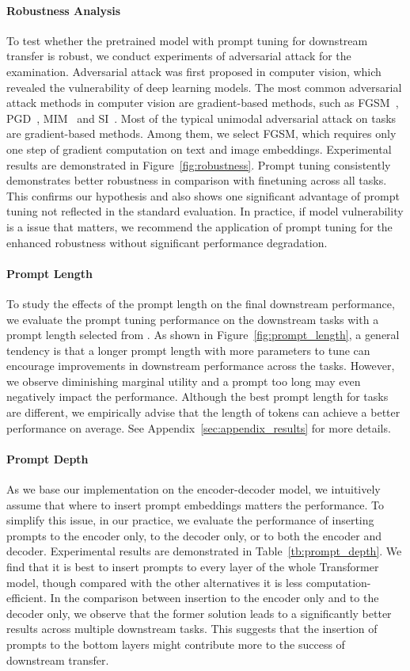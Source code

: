 \documentclass[11pt]{article}
\begin{document}
\paragraph{Robustness Analysis}
To test whether the pretrained model with prompt tuning for downstream transfer is robust, we conduct experiments of adversarial attack for the examination. 
Adversarial attack was first proposed in computer vision, which revealed the vulnerability of deep learning models. The most common adversarial attack methods in computer vision are gradient-based methods, such as FGSM~\citep{fgsm}, PGD~\citep{pgd}, MIM~\citep{mim} and SI~\citep{si}. 
Most of the typical unimodal adversarial attack on tasks are gradient-based methods. 
Among them, we select FGSM, which requires only one step of gradient computation on text and image embeddings. 
Experimental results are demonstrated in Figure~\ref{fig:robustness}. 
Prompt tuning consistently demonstrates better robustness in comparison with finetuning across all tasks. 
This confirms our hypothesis and also shows one significant advantage of prompt tuning not reflected in the standard evaluation. 
In practice, if model vulnerability is a issue that matters, we recommend the application of prompt tuning for the enhanced robustness without significant performance degradation. 

\paragraph{Prompt Length}
To study the effects of the prompt length on the final downstream performance, we evaluate the prompt tuning performance on the downstream tasks with a prompt length selected from . 
As shown in Figure~\ref{fig:prompt_length}, a general tendency is that a longer prompt length with more parameters to tune can encourage improvements in downstream performance across the tasks. 
However, we observe diminishing marginal utility and a prompt too long may even negatively impact the performance. 
Although the best prompt length for tasks are different, we empirically advise that the length of  tokens can achieve a better performance on average. See Appendix~\ref{sec:appendix_results} for more details. 

\paragraph{Prompt Depth}
As we base our implementation on the encoder-decoder model, we intuitively assume that where to insert prompt embeddings matters the performance. 
To simplify this issue, in our practice, we evaluate the performance of inserting prompts to the encoder only, to the decoder only, or to both the encoder and decoder. 
Experimental results are demonstrated in Table~\ref{tb:prompt_depth}. 
We find that it is best to insert prompts to every layer of the whole Transformer model, though compared with the other alternatives it is less computation-efficient. 
In the comparison between insertion to the encoder only and to the decoder only, we observe that the former solution leads to a significantly better results across multiple downstream tasks. 
This suggests that the insertion of prompts to the bottom layers might contribute more to the success of downstream transfer. 
\end{document}
